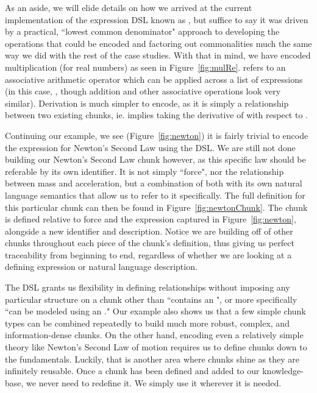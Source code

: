 
As an aside, we will elide details on how we arrived at the current 
implementation of the expression DSL known as , but suffice to say 
it was driven by a practical, ``lowest common denominator" approach to 
developing the operations that could be encoded and factoring out commonalities 
much the same way we did with the rest of the case studies. With that in mind, 
we have encoded multiplication (for real numbers) as seen in 
Figure~\ref{fig:mulRe}.  refers to an associative arithmetic 
operator which can be applied across a list of expressions (in this case, 
, though addition and other associative operations look very 
similar). Derivation is much simpler to encode, as it is simply a relationship 
between two existing chunks, ie.  implies taking the 
derivative of  with respect to .


Continuing our example, we see (Figure~\ref{fig:newton}) it is fairly trivial 
to encode the expression for Newton's Second Law using the  DSL. We 
are still not done building our Newton's Second Law chunk however, as this 
specific law should be referable by its own identifier. It is not simply 
``force", nor the relationship between mass and acceleration, but a combination 
of both with its own natural language semantics that allow us to refer to it 
specifically. The full definition for this particular chunk can then be found 
in Figure~\ref{fig:newtonChunk}. The chunk is defined relative to force and the 
expression captured in Figure~\ref{fig:newton}, alongside a new identifier and 
description. Notice we are building off of other chunks throughout each piece 
of the chunk's definition, thus giving us perfect traceability from beginning 
to end, regardless of whether we are looking at a defining expression or 
natural language description.


The  DSL grants us flexibility in defining relationships without 
imposing any particular structure on a chunk other than ``contains an 
", or more specifically ``can be modeled using an ." 
Our example also shows us that a few simple chunk types can be combined 
repeatedly to build much more robust, complex, and information-dense chunks. On 
the other hand, encoding even a relatively simple theory like Newton's Second 
Law of motion requires us to define chunks down to the fundamentals. 
Luckily, that is another area where chunks shine as they are infinitely 
reusable. Once a chunk has been defined and added to our knowledge-base, we 
never need to redefine it. We simply use it wherever it is needed.

